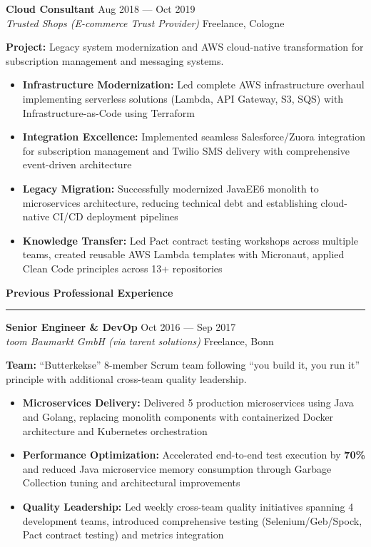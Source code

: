 \documentclass[11pt,a4paper]{article}
\newcommand{\sectiontitle}[1]{%
  \vspace{8pt}
  {\color{darkblue}\Large\bfseries #1}
  \vspace{4pt}
  \hrule
  \vspace{6pt}
}
\newcommand{\jobtitle}[4]{%
  \vspace{4pt}
  {\bfseries #1} \hfill {\color{lightgray}\small #2}\\
  {\itshape #3} \hfill {\color{lightgray}\small #4}
  \vspace{2pt}
}
\begin{document}
\vspace{6pt}

\jobtitle{Cloud Consultant}{Aug 2018 --- Oct 2019}{Trusted Shops (E-commerce Trust Provider)}{Freelance, Cologne}

\textbf{Project:} Legacy system modernization and AWS cloud-native transformation for subscription management and messaging systems.

\begin{itemize}
\item \textbf{Infrastructure Modernization:} Led complete AWS infrastructure overhaul implementing serverless solutions (Lambda, API Gateway, S3, SQS) with Infrastructure-as-Code using Terraform
\item \textbf{Integration Excellence:} Implemented seamless Salesforce/Zuora integration for subscription management and Twilio SMS delivery with comprehensive event-driven architecture
\item \textbf{Legacy Migration:} Successfully modernized JavaEE6 monolith to microservices architecture, reducing technical debt and establishing cloud-native CI/CD deployment pipelines
\item \textbf{Knowledge Transfer:} Led Pact contract testing workshops across multiple teams, created reusable AWS Lambda templates with Micronaut, applied Clean Code principles across 13+ repositories
\end{itemize}

\vfill

\newpage

\sectiontitle{Previous Professional Experience}

\jobtitle{Senior Engineer \& DevOp}{Oct 2016 --- Sep 2017}{toom Baumarkt GmbH (via tarent solutions)}{Freelance, Bonn}

\textbf{Team:} ``Butterkekse'' 8-member Scrum team following ``you build it, you run it'' principle with additional cross-team quality leadership.

\begin{itemize}
\item \textbf{Microservices Delivery:} Delivered 5 production microservices using Java and Golang, replacing monolith components with containerized Docker architecture and Kubernetes orchestration
\item \textbf{Performance Optimization:} Accelerated end-to-end test execution by \textbf{70\%} and reduced Java microservice memory consumption through Garbage Collection tuning and architectural improvements
\item \textbf{Quality Leadership:} Led weekly cross-team quality initiatives spanning 4 development teams, introduced comprehensive testing (Selenium/Geb/Spock, Pact contract testing) and metrics integration
\end{itemize}
\end{document}
